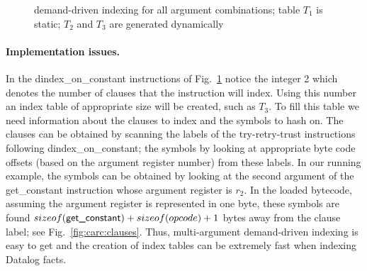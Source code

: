 \documentclass{llncs}
\newcommand{\wamcodesize}{scriptsize}
\newcommand{\code}[1]{\texttt{#1}}
\newcommand{\instr}[1]{\textsf{#1}}
\newcommand{\try}{\instr{try}\xspace}
\newcommand{\trust}{\instr{trust}\xspace}
\newcommand{\TryRetryTrust}{\mbox{\instr{try-retry-trust}}\xspace}
\newcommand{\jump}{\instr{jump}\xspace}
\newcommand{\jitiONconstant}{\mbox{\instr{dindex\_on\_constant}}\xspace}
\newcommand{\getcon}{\mbox{\instr{get\_constant}}\xspace}
\newcommand{\Cline}{\cline{2-3}}
\newcommand{\JITI}{demand-driven indexing\xspace}
\begin{document}
\begin{figure}[t]
  \caption{\JITI for all argument combinations;
    table $T_1$ is static; $T_2$ and $T_3$ are generated dynamically}
  \label{fig:carc:jiti_multi}
\end{figure}

\paragraph{Implementation issues.}
In the \jitiONconstant instructions of Fig.~\ref{fig:carc:jiti_multi}
notice the integer 2 which denotes the number of clauses that the
instruction will index. Using this number an index table of
appropriate size will be created, such as $T_3$. To fill this table we
need information about the clauses to index and the symbols to hash
on. The clauses can be obtained by scanning the labels of the
\TryRetryTrust instructions following \jitiONconstant; the symbols by
looking at appropriate byte code offsets (based on the argument
register number) from these labels. In our running example, the
symbols can be obtained by looking at the second argument of the
\getcon instruction whose argument register is $r_2$. In the loaded
bytecode, assuming the argument register is represented in one byte,
these symbols are found $sizeof(\getcon) + sizeof(opcode) + 1$ bytes
away from the clause label; see Fig.~\ref{fig:carc:clauses}. Thus,
multi-argument \JITI is easy to get and the creation of index tables
can be extremely fast when indexing Datalog facts.
\end{document}
